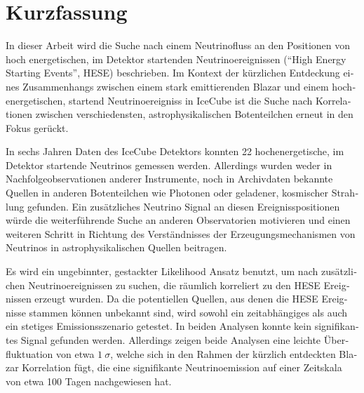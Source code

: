 \section*{Kurzfassung}
\begin{german}
In dieser Arbeit wird die Suche nach einem Neutrinofluss an den Positionen von hoch energetischen, im Detektor startenden Neutrinoereignissen (\enquote{High Energy Starting Events}, HESE) beschrieben.
Im Kontext der kürzlichen Entdeckung eines Zusammenhangs zwischen einem stark emittierenden Blazar und einem hochenergetischen, startend Neutrinoereigniss in IceCube ist die Suche nach Korrelationen zwischen verschiedensten, astrophysikalischen Botenteilchen erneut in den Fokus gerückt.

In sechs Jahren Daten des IceCube Detektors konnten 22 hochenergetische, im Detektor startende Neutrinos gemessen werden.
Allerdings wurden weder in Nachfolgeobservationen anderer Instrumente, noch in Archivdaten bekannte Quellen in anderen Botenteilchen wie Photonen oder geladener, kosmischer Strahlung gefunden.
Ein zusätzliches Neutrino Signal an diesen Ereignisspositionen würde die weiterführende Suche an anderen Observatorien motivieren und einen weiteren Schritt in Richtung des Verständnisses der Erzeugungsmechanismen von Neutrinos in astrophysikalischen Quellen beitragen.

Es wird ein ungebinnter, gestackter Likelihood Ansatz benutzt, um nach zusätzlichen Neutrinoereignissen zu suchen, die räumlich korreliert zu den HESE Ereignissen erzeugt wurden.
Da die potentiellen Quellen, aus denen die HESE Ereignisse stammen können unbekannt sind, wird sowohl ein zeitabhängiges als auch ein stetiges Emissionsszenario getestet.
In beiden Analysen konnte kein signifikantes Signal gefunden werden.
Allerdings zeigen beide Analysen eine leichte Überfluktuation von etwa $\SI{1}{\sigma}$, welche sich in den Rahmen der kürzlich entdeckten Blazar Korrelation fügt, die eine signifikante Neutrinoemission auf einer Zeitskala von etwa 100 Tagen nachgewiesen hat.
\end{german}